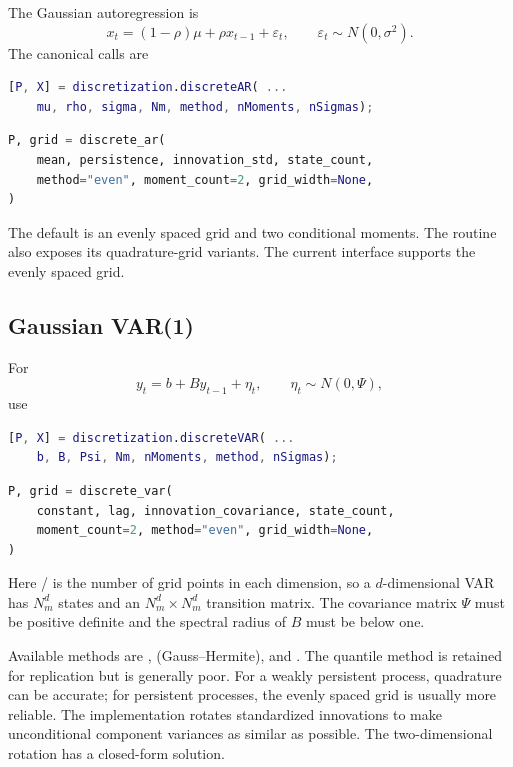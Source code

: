 The Gaussian autoregression is
\begin{equation}
  x_t=(1-\rho)\mu+\rho x_{t-1}+\varepsilon_t,
  \qquad \varepsilon_t\sim N(0,\sigma^2).
\end{equation}
The canonical calls are
\begin{lstlisting}[language=Matlab]
[P, X] = discretization.discreteAR( ...
    mu, rho, sigma, Nm, method, nMoments, nSigmas);
\end{lstlisting}
\begin{lstlisting}[language=Python]
P, grid = discrete_ar(
    mean, persistence, innovation_std, state_count,
    method="even", moment_count=2, grid_width=None,
)
\end{lstlisting}
The default is an evenly spaced grid and two conditional moments. The
\matlab{} routine also exposes its quadrature-grid variants. The current
\python{}  interface supports the evenly spaced grid.

\subsection{Gaussian VAR(1)}

For
\begin{equation}
  y_t=b+B y_{t-1}+\eta_t,
  \qquad \eta_t\sim N(0,\Psi),
\end{equation}
use
\begin{lstlisting}[language=Matlab]
[P, X] = discretization.discreteVAR( ...
    b, B, Psi, Nm, nMoments, method, nSigmas);
\end{lstlisting}
\begin{lstlisting}[language=Python]
P, grid = discrete_var(
    constant, lag, innovation_covariance, state_count,
    moment_count=2, method="even", grid_width=None,
)
\end{lstlisting}
Here / is the number of grid points in each
dimension, so a $d$-dimensional VAR has $N_m^d$ states and an
$N_m^d\times N_m^d$ transition matrix. The covariance matrix $\Psi$ must be
positive definite and the spectral radius of $B$ must be below one.

Available methods are ,  (Gauss--Hermite),
and . The quantile method is retained for replication but is
generally poor. For a weakly persistent process, quadrature can be accurate;
for persistent processes, the evenly spaced grid is usually more reliable.
The implementation rotates standardized innovations to make unconditional
component variances as similar as possible. The two-dimensional rotation has a
closed-form solution.

